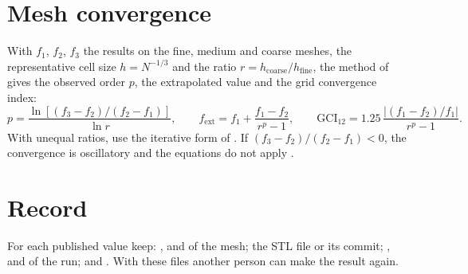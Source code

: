 \section{Mesh convergence}\label{sec:gci}

With $f_1$, $f_2$, $f_3$ the results on the fine, medium and coarse meshes, the
representative cell size $h = N^{-1/3}$ and the ratio $r = h_\text{coarse}/h_\text{fine}$,
the method of \citet{celik2008} gives the observed order $p$, the extrapolated value and
the grid convergence index:
\[
  p = \frac{\ln\left[(f_3 - f_2)/(f_2 - f_1)\right]}{\ln r},\qquad
  f_\text{ext} = f_1 + \frac{f_1 - f_2}{r^p - 1},\qquad
  \text{GCI}_{12} = 1.25\,\frac{|(f_1 - f_2)/f_1|}{r^p - 1}.
\]
With unequal ratios, use the iterative form of \citet{celik2008}. If
$(f_3 - f_2)/(f_2 - f_1) < 0$, the convergence is oscillatory and the equations do not
apply \citep{roache1994}.

\section{Record}

For each published value keep: ,  and
 of the mesh; the STL file or its commit; ,
 and  of the run; and .
With these files another person can make the result again.
